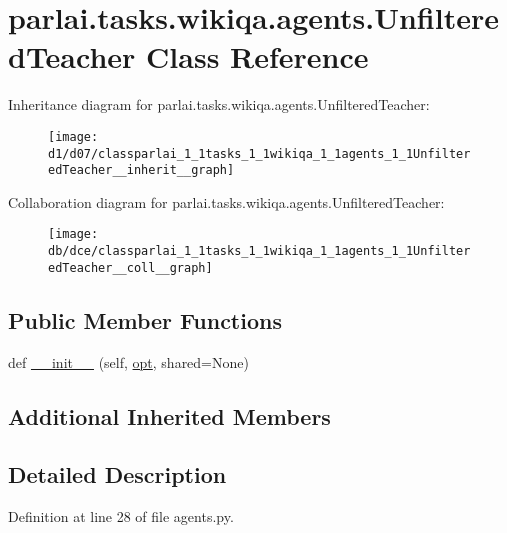 \hypertarget{classparlai_1_1tasks_1_1wikiqa_1_1agents_1_1UnfilteredTeacher}{}\section{parlai.\+tasks.\+wikiqa.\+agents.\+Unfiltered\+Teacher Class Reference}
\label{classparlai_1_1tasks_1_1wikiqa_1_1agents_1_1UnfilteredTeacher}


Inheritance diagram for parlai.\+tasks.\+wikiqa.\+agents.\+Unfiltered\+Teacher\+:\nopagebreak
\begin{figure}[H]
\begin{center}
\leavevmode
\texttt{[image: d1/d07/classparlai\_1\_1tasks\_1\_1wikiqa\_1\_1agents\_1\_1UnfilteredTeacher\_\_inherit\_\_graph]}
\end{center}
\end{figure}


Collaboration diagram for parlai.\+tasks.\+wikiqa.\+agents.\+Unfiltered\+Teacher\+:\nopagebreak
\begin{figure}[H]
\begin{center}
\leavevmode
\texttt{[image: db/dce/classparlai\_1\_1tasks\_1\_1wikiqa\_1\_1agents\_1\_1UnfilteredTeacher\_\_coll\_\_graph]}
\end{center}
\end{figure}
\subsection*{Public Member Functions}
\begin{DoxyCompactItemize}
\item 
def \hyperlink{classparlai_1_1tasks_1_1wikiqa_1_1agents_1_1UnfilteredTeacher_a3f69b4069d4702ca92b2ce728f0e4ca4}{\+\_\+\+\_\+init\+\_\+\+\_\+} (self, \hyperlink{classparlai_1_1core_1_1teachers_1_1FbDialogTeacher_af7a9ec497b9cd0292d7b8fa220da7c28}{opt}, shared=None)
\end{DoxyCompactItemize}
\subsection*{Additional Inherited Members}


\subsection{Detailed Description}


Definition at line 28 of file agents.\+py.



